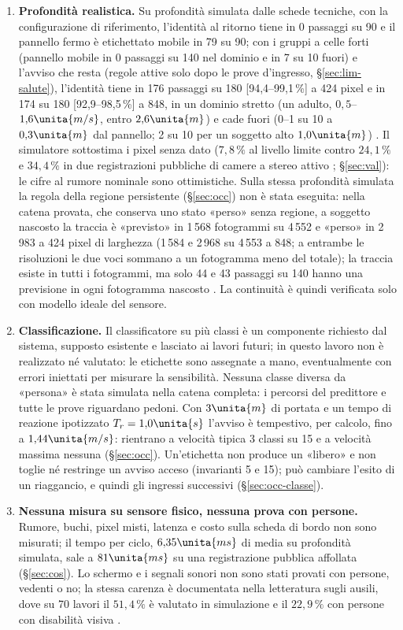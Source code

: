 \begin{enumerate}[label=\arabic*.,ref=\arabic*,leftmargin=1.8em]
\item \textbf{Profondità realistica.} Su profondità simulata dalle schede tecniche, con la configurazione di riferimento, l'identità al ritorno tiene in 0 passaggi su 90 e il pannello fermo è etichettato mobile in 79 su 90; con i gruppi a celle forti (pannello mobile in 0 passaggi su 140 nel dominio e in 7 su 10 fuori) e l'avviso che resta (regole attive solo dopo le prove d'ingresso, \S\ref{sec:lim-salute}), l'identità tiene in 176 passaggi su 180 [94,4--99,1\,\%] a 424 pixel e in 174 su 180 [92,9--98,5\,\%] a 848, in un dominio stretto (un adulto, $0{,}5$--$1{,}6\unita{m/s}$, entro $2{,}6\unita{m}$) e cade fuori (0--1 su 10 a $0{,}3\unita{m}$ dal pannello; 2 su 10 per un soggetto alto $1{,}0\unita{m}$) . Il simulatore sottostima i pixel senza dato ($7{,}8\,\%$ al livello limite contro $24{,}1\,\%$ e $34{,}4\,\%$ in due registrazioni pubbliche di camere a stereo attivo ; \S\ref{sec:val}): le cifre al rumore nominale sono ottimistiche. Sulla stessa profondità simulata la regola della regione persistente (\S\ref{sec:occ}) non è stata eseguita: nella catena provata, che conserva uno stato «perso» senza regione, a soggetto nascosto la traccia è «previsto» in 1\,568 fotogrammi su 4\,552 e «perso» in 2\,983 a 424 pixel di larghezza (1\,584 e 2\,968 su 4\,553 a 848; a entrambe le risoluzioni le due voci sommano a un fotogramma meno del totale); la traccia esiste in tutti i fotogrammi, ma solo 44 e 43 passaggi su 140 hanno una previsione in ogni fotogramma nascosto . La continuità è quindi verificata solo con modello ideale del sensore.
\item \textbf{Classificazione.} Il classificatore su più classi è un componente richiesto dal sistema, supposto esistente e lasciato ai lavori futuri; in questo lavoro non è realizzato né valutato: le etichette sono assegnate a mano, eventualmente con errori iniettati per misurare la sensibilità. Nessuna classe diversa da «persona» è stata simulata nella catena completa: i percorsi del predittore e tutte le prove riguardano pedoni. Con $3\unita{m}$ di portata e un tempo di reazione ipotizzato $T_r=1{,}0\unita{s}$ l'avviso è tempestivo, per calcolo, fino a $1{,}44\unita{m/s}$: rientrano a velocità tipica 3 classi su 15 e a velocità massima nessuna  (\S\ref{sec:occ}). Un'etichetta non produce un «libero» e non toglie né restringe un avviso acceso (invarianti 5 e 15); può cambiare l'esito di un riaggancio, e quindi gli ingressi successivi (\S\ref{sec:occ-classe}).
\item \textbf{Nessuna misura su sensore fisico, nessuna prova con persone.} Rumore, buchi, pixel misti, latenza e costo sulla scheda di bordo non sono misurati; il tempo per ciclo, $6{,}35\unita{ms}$ di media su profondità simulata, sale a $81\unita{ms}$ su una registrazione pubblica affollata  (\S\ref{sec:cos}). Lo schermo e i segnali sonori non sono stati provati con persone, vedenti o no; la stessa carenza è documentata nella letteratura sugli ausili, dove su 70 lavori il $51{,}4\,\%$ è valutato in simulazione e il $22{,}9\,\%$ con persone con disabilità visiva \cite{romlay2021}.
\end{enumerate}

